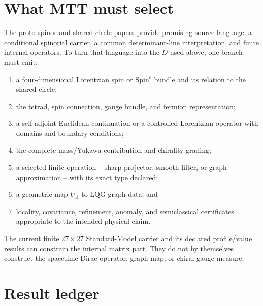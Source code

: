 \documentclass[11pt]{article}
\begin{document}
\section{What MTT must select}

The proto-spinor and shared-circle papers provide promising source language:
a conditional spinorial carrier, a common determinant-line interpretation,
and finite internal operators. To turn that language into the \(D\) used
above, one branch must emit:
\begin{enumerate}
\item a four-dimensional Lorentzian spin or \(\mathrm{Spin}^c\) bundle and
  its relation to the shared circle;
\item the tetrad, spin connection, gauge bundle, and fermion representation;
\item a self-adjoint Euclidean continuation or a controlled Lorentzian
  operator with domains and boundary conditions;
\item the complete mass/Yukawa contribution and chirality grading;
\item a selected finite operation -- sharp projector, smooth filter, or
  graph approximation -- with its exact type declared;
\item a geometric map \(U_\Lambda\) to LQG graph data; and
\item locality, covariance, refinement, anomaly, and semiclassical
  certificates appropriate to the intended physical claim.
\end{enumerate}

The current finite \(27\times27\) Standard-Model carrier and its declared
profile/value results can constrain the internal matrix part. They do not by
themselves construct the spacetime Dirac operator, graph map, or chiral gauge
measure.

\section{Result ledger}
\end{document}
